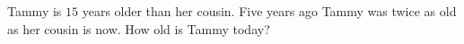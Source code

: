 Tammy is $15$ years older than her cousin. Five years ago Tammy was twice as old as her cousin is now. How old is Tammy today?
